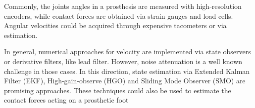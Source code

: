 \documentclass[letterpaper, 10 pt, conference]{ieeeconf}  %
\theoremstyle{plain}
\theoremstyle{definition}
\theoremstyle{remark}
\begin{document}





Commonly, the joints angles in a prosthesis are measured with high-resolution encoders, while contact forces are obtained via strain gauges and load cells. Angular velocities could be acquired through expensive tacometers or via estimation.

In general, numerical approaches for velocity are implemented via state observers or derivative filters, like lead filter. However, noise attenuation is a well known challenge in those cases. In this direction, state estimation via Extended Kalman Filter (EKF), High-gain-observe (HGO) and Sliding Mode Observer (SMO) are promising approaches. These techniques could also be used to estimate the contact forces acting on a prosthetic foot
\end{document}
